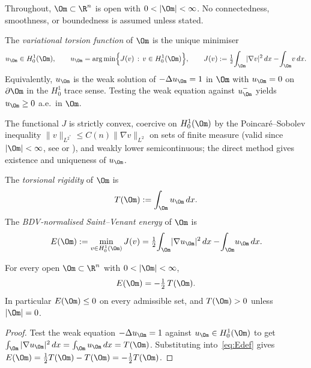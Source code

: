 Throughout, $\Om\subset\R^n$ is open with $0<|\Om|<\infty$. No
connectedness, smoothness, or boundedness is assumed unless stated.

\begin{definition}\label{def:utorsion}
The \emph{variational torsion function} of $\Om$ is the unique
minimiser
\[
   u_\Om\in H^{1}_{0}(\Om),\qquad
   u_\Om=\arg\min\Bigl\{
   J(v)\,:\,v\in H^{1}_{0}(\Om)
   \Bigr\},
   \qquad
   J(v):=\tfrac12\!\int_{\Om}\!|\nabla v|^{2}\,dx-\!\int_{\Om}\!v\,dx.
\]
Equivalently, $u_\Om$ is the weak solution of $-\Delta u_\Om=1$ in
$\Om$ with $u_\Om=0$ on $\partial\Om$ in the $H^{1}_{0}$ trace sense.
Testing the weak equation against $u_\Om^{-}$ yields $u_\Om\ge 0$
a.e.\ in $\Om$.
\end{definition}

\begin{remark}[Existence]
The functional $J$ is strictly convex, coercive on $H^{1}_{0}(\Om)$ by
the Poincar\'e--Sobolev inequality
$\|v\|_{L^{2^*}}\le C(n)\|\nabla v\|_{L^{2}}$ on sets of finite
measure (valid since $|\Om|<\infty$, see \cite[Cor.~12.18]{Maggi2012}
or \cite[Thm.~4.9]{HenrotBook}), and weakly lower semicontinuous; the
direct method gives existence and uniqueness of $u_\Om$.
\end{remark}

\begin{definition}
\label{def:Trigidity}
The \emph{torsional rigidity} of $\Om$ is
\begin{equation}\label{eq:Tdef}
   T(\Om):=\int_{\Om}u_\Om\,dx.
\end{equation}
The \emph{BDV-normalised Saint--Venant energy} of $\Om$ is
\begin{equation}\label{eq:Edef}
   E(\Om):=\min_{v\in H^{1}_{0}(\Om)}J(v)
   =\tfrac12\!\int_{\Om}\!|\nabla u_\Om|^{2}\,dx-\!\int_{\Om}\!u_\Om\,dx.
\end{equation}
\end{definition}

\begin{lemma}\label{lem:E-T}
For every open $\Om\subset\R^n$ with $0<|\Om|<\infty$,
\begin{equation}\label{eq:E-T}
   E(\Om)=-\tfrac12\,T(\Om).
\end{equation}
In particular $E(\Om)\le 0$ on every admissible set, and $T(\Om)>0$
unless $|\Om|=0$.
\end{lemma}

\begin{proof}
Test the weak equation $-\Delta u_\Om=1$ against $u_\Om\in H^{1}_{0}(\Om)$
to get $\int_\Om|\nabla u_\Om|^2\,dx=\int_\Om u_\Om\,dx=T(\Om)$.
Substituting into~\eqref{eq:Edef} gives
$E(\Om)=\tfrac12 T(\Om)-T(\Om)=-\tfrac12 T(\Om)$.
\end{proof}

